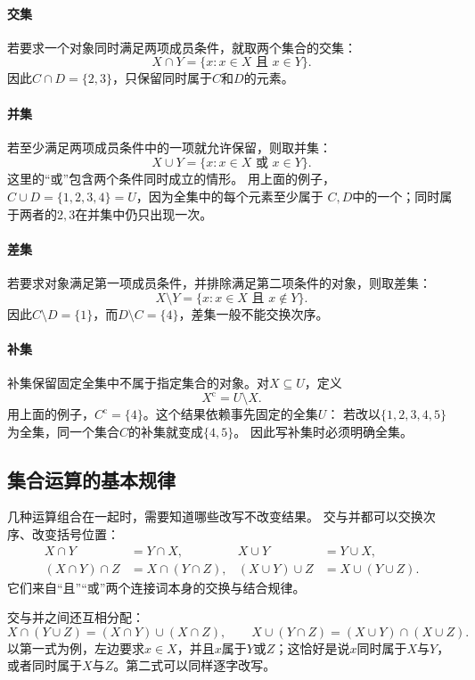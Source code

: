 \paragraph{交集}
若要求一个对象同时满足两项成员条件，就取两个集合的交集：
\[
  X\cap Y=\{x:x\in X\text{ 且 }x\in Y\}.
\]
因此$C\cap D=\{2,3\}$，只保留同时属于$C$和$D$的元素。

\paragraph{并集}
若至少满足两项成员条件中的一项就允许保留，则取并集：
\[
  X\cup Y=\{x:x\in X\text{ 或 }x\in Y\}.
\]
这里的“或”包含两个条件同时成立的情形。
用上面的例子，$C\cup D=\{1,2,3,4\}=U$，因为全集中的每个元素至少属于
$C,D$中的一个；同时属于两者的$2,3$在并集中仍只出现一次。

\paragraph{差集}
若要求对象满足第一项成员条件，并排除满足第二项条件的对象，则取差集：
\[
  X\setminus Y=\{x:x\in X\text{ 且 }x\notin Y\}.
\]
因此$C\setminus D=\{1\}$，而$D\setminus C=\{4\}$，差集一般不能交换次序。

\paragraph{补集}
补集保留固定全集中不属于指定集合的对象。对$X\subseteq U$，定义
\[
  X^{\mathrm c}=U\setminus X.
\]
用上面的例子，$C^{\mathrm c}=\{4\}$。这个结果依赖事先固定的全集$U$：
若改以$\{1,2,3,4,5\}$为全集，同一个集合$C$的补集就变成$\{4,5\}$。
因此写补集时必须明确全集。

\subsection{集合运算的基本规律}
几种运算组合在一起时，需要知道哪些改写不改变结果。
交与并都可以交换次序、改变括号位置：
\[
 \begin{aligned}
  X\cap Y&=Y\cap X,&
  X\cup Y&=Y\cup X,\\
  (X\cap Y)\cap Z&=X\cap(Y\cap Z),&
  (X\cup Y)\cup Z&=X\cup(Y\cup Z).
 \end{aligned}
\]
它们来自“且”“或”两个连接词本身的交换与结合规律。

交与并之间还互相分配：
\[
 X\cap(Y\cup Z)=(X\cap Y)\cup(X\cap Z),\qquad
 X\cup(Y\cap Z)=(X\cup Y)\cap(X\cup Z).
\]
以第一式为例，左边要求$x\in X$，并且$x$属于$Y$或$Z$；这恰好是说$x$同时属于$X$与$Y$，
或者同时属于$X$与$Z$。第二式可以同样逐字改写。

